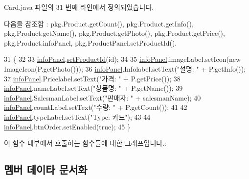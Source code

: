 Card.\+java 파일의 31 번째 라인에서 정의되었습니다.



다음을 참조함 \+:  pkg.\+Product.\+get\+Count(), pkg.\+Product.\+get\+Info(), pkg.\+Product.\+get\+Name(), pkg.\+Product.\+get\+Photo(), pkg.\+Product.\+get\+Price(), pkg.\+Product.\+info\+Panel, pkg.\+Product\+Panel.\+set\+Product\+Id().


\begin{DoxyCode}
31                                                                 \{
32         
33         \hyperlink{classpkg_1_1_product_a6755de182d9383bc860fa44a8a01789d}{infoPanel}.\hyperlink{classpkg_1_1_product_panel_ae1cb96da7cd48c10f53c8c9f8e44d4d3}{setProductId}(\textcolor{keywordtype}{id});
34         
35         \hyperlink{classpkg_1_1_product_a6755de182d9383bc860fa44a8a01789d}{infoPanel}.imageLabel.setIcon(\textcolor{keyword}{new} ImageIcon(P.getPhoto()));
36         \hyperlink{classpkg_1_1_product_a6755de182d9383bc860fa44a8a01789d}{infoPanel}.Infolabel.setText(\textcolor{stringliteral}{"설명: "} + P.getInfo());
37         \hyperlink{classpkg_1_1_product_a6755de182d9383bc860fa44a8a01789d}{infoPanel}.Pricelabel.setText(\textcolor{stringliteral}{"가격: "} + P.getPrice());
38         \hyperlink{classpkg_1_1_product_a6755de182d9383bc860fa44a8a01789d}{infoPanel}.nameLabel.setText(\textcolor{stringliteral}{"상품명: "} + P.getName());
39         \hyperlink{classpkg_1_1_product_a6755de182d9383bc860fa44a8a01789d}{infoPanel}.SalesmanLabel.setText(\textcolor{stringliteral}{"판매자: "} + salesmanName);
40         \hyperlink{classpkg_1_1_product_a6755de182d9383bc860fa44a8a01789d}{infoPanel}.countLabel.setText(\textcolor{stringliteral}{"수량: "} + P.getCount());
41         
42         \hyperlink{classpkg_1_1_product_a6755de182d9383bc860fa44a8a01789d}{infoPanel}.typeLabel.setText(\textcolor{stringliteral}{"Type: 카드"});
43         
44         \hyperlink{classpkg_1_1_product_a6755de182d9383bc860fa44a8a01789d}{infoPanel}.btnOrder.setEnabled(\textcolor{keyword}{true});
45     \}
\end{DoxyCode}


이 함수 내부에서 호출하는 함수들에 대한 그래프입니다.\+:




\subsection{멤버 데이타 문서화}
